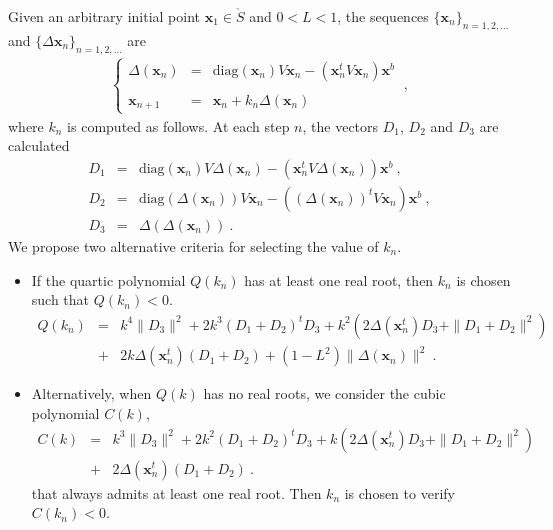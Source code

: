 \documentclass[preprint,11pt,authoryear]{elsarticle}
\begin{document}
Given an arbitrary initial point $\mathbf{x}_1 \in \mathring{S}$ and $0<L<1$, the sequences $\{\mathbf{x}_n\}_{n=1,2,\dots}$ and $\{\Delta \mathbf{x}_n\}_{n=1,2,\dots}$ are 
\begin{eqnarray} \label{succ1}
\left \{ \begin{array}{lcl}
\Delta (\mathbf{x}_n) &=& \textrm{diag}(\mathbf{x}_n) V \mathbf{x}_n - (\mathbf{x}_n^t V \mathbf{x}_n) \mathbf{x}^b \\ \\ 
\mathbf{x}_{n+1} &=& \mathbf{x}_n + k_n \Delta (\mathbf{x}_n) 
\end{array} \right . \ ,
\end{eqnarray}
where $k_n$ is computed as follows. At each step $n$, the vectors $D_1$, $D_2$ and $D_3$ are calculated 
\begin{eqnarray*}
D_1&=& \textrm{diag}(\mathbf{x}_n) V \Delta (\mathbf{x}_n) -(\mathbf{x}_n^t V \Delta (\mathbf{x}_n)) \mathbf{x}^b  \ ,\\
D_2&=& \textrm{diag}(\Delta (\mathbf{x}_n) ) V \mathbf{x}_n - ((\Delta (\mathbf{x}_n))^t V  \mathbf{x}_n )  \mathbf{x}^b  \ , \\
D_3&=& \Delta (\Delta (\mathbf{x}_n) )   \ .
\end{eqnarray*}
We propose two alternative criteria for selecting the value of $k_n$.  
\begin{itemize}
\item If the quartic polynomial $Q(k_n)$ has at least one real root, then $k_n$ is chosen such that $Q(k_n) < 0$. 
\begin{eqnarray*}
Q(k_n)&=&k^4 \|D_3\|^2 + 2 k^3 (D_1+D_2)^tD_3  + k^2 (2\Delta (\mathbf{x}_n^t) D_3 + \|D_1+D_2\|^2) \\
&+& 2 k \Delta (\mathbf{x}_n ^t) (D_1+D_2)  + (1-L^2)\|\Delta (\mathbf{x}_n) \|^2 \  . 
\end{eqnarray*}
\item Alternatively, when $Q(k)$ has no real roots, we consider the cubic polynomial $C(k)$,
\begin{eqnarray*}
C(k)&=&k^3 \|D_3\|^2 + 2 k^2 (D_1+D_2)^tD_3  + k (2\Delta (\mathbf{x}_n^t) D_3 + \|D_1+D_2\|^2) \\
&+& 2  \Delta (\mathbf{x}_n^t) (D_1+D_2) \  . 
\end{eqnarray*}
\noindent that always admits at least one real root. Then $k_n$ is chosen to verify $C(k_n) < 0$.
\end{itemize}
\end{document}
